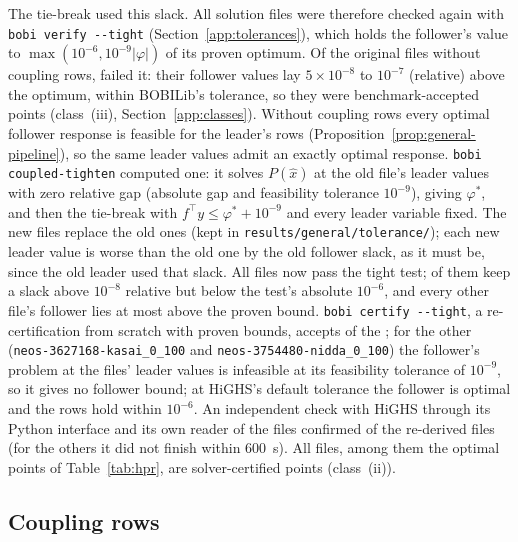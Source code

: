 \begin{sloppypar}
The tie-break used this slack. All solution files were therefore checked again
with \texttt{bobi verify -{}-tight} (Section~\ref{app:tolerances}), which holds the
follower's value to $\max(10^{-6},10^{-9}|\varphi|)$ of its proven optimum. Of
the original files without coupling rows, \NumTightSupersededGeneral{} failed
it: their follower values lay $5\times10^{-8}$ to $10^{-7}$ (relative) above the
optimum, within BOBILib's tolerance, so they were benchmark-accepted points
(class~(iii), Section~\ref{app:classes}). Without coupling rows every optimal
follower response is feasible for the leader's rows
(Proposition~\ref{prop:general-pipeline}), so the same leader values admit an
exactly optimal response. \texttt{bobi coupled-tighten} computed one: it solves
$P(\hat x)$ at the old file's leader values with zero relative gap (absolute gap
and feasibility tolerance $10^{-9}$), giving $\varphi^{*}$, and then the tie-break
with $f^{\top}y\le\varphi^{*}+10^{-9}$ and every leader variable fixed. The new files
replace the old ones (kept in \texttt{results/general/tolerance/}); each new leader
value is worse than the old one by the old follower slack, as it must be, since
the old leader used that slack. All \NumGeneralFiles{} files now pass the tight
test; \NumTightRelAbove{} of them keep a slack above $10^{-8}$ relative but below
the test's absolute $10^{-6}$, and every other file's follower lies at most
\TightMaxSlackOther{} above the proven bound. \texttt{bobi certify -{}-tight}, a
re-certification from scratch with proven bounds, accepts \NumGeneralTightCertified{}
of the \NumGeneralFiles{}; for the other \NumGeneralTightNoBound{}
(\texttt{neos-3627168-kasai\_0\_100} and \texttt{neos-3754480-nidda\_0\_100}) the
follower's problem at the files' leader values is infeasible at its feasibility
tolerance of $10^{-9}$, so it gives no follower bound; at HiGHS's default
tolerance the follower is optimal and the rows hold within $10^{-6}$. An
independent check with HiGHS through its Python interface and its own reader of
the files confirmed \NumGeneralPycheckDone{} of the \NumGeneralPycheck{} re-derived
files (for the others it did not finish within 600~s). All \NumGeneralFiles{} files,
among them the \NumGeneralFilesOptimal{} optimal points of Table~\ref{tab:hpr}, are solver-certified
points (class~(ii)).
\end{sloppypar}

\subsection{Coupling rows}

